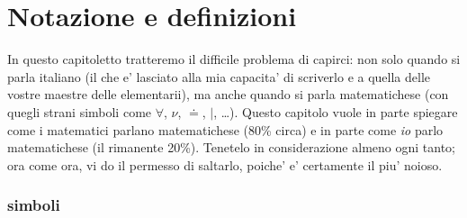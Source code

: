 \label{notazione}
\chapter{Notazione e definizioni}


In questo capitoletto tratteremo il difficile problema di capirci: non solo quando si parla italiano (il che e' lasciato
alla mia capacita' di scriverlo e a quella delle vostre maestre delle elementarii), ma anche quando si parla matematichese
(con quegli strani simboli come $\forall$, $\nu$, $\doteq$, $|$, \ldots). Questo capitolo vuole in parte spiegare come i
matematici parlano matematichese (80\% circa) e in parte come {\em io} parlo matematichese (il rimanente 20\%).
Tenetelo in considerazione almeno ogni tanto; ora come ora, vi do il permesso di saltarlo, poiche' e' certamente il piu' noioso.

\subsection{simboli}

